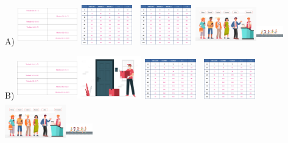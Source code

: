 \begin{escolha}
\begin{escolha}
{{{{A)
\includegraphics[width=1.02736in,height=0.68704in]{media/image110.png}\includegraphics[width=1.01042in,height=0.67572in]{media/image111.png}\includegraphics[width=1.01042in,height=0.67572in]{media/image111.png}\includegraphics[width=1.04264in,height=0.69727in]{media/image113.png}\includegraphics[width=0.45621in,height=0.44100in]{media/image138.png}

B)
\includegraphics[width=1.02736in,height=0.68704in]{media/image110.png}\includegraphics[width=1.09268in,height=0.73073in]{media/image112.png}\includegraphics[width=1.01042in,height=0.67572in]{media/image111.png}\includegraphics[width=1.01042in,height=0.67572in]{media/image111.png}\includegraphics[width=1.04264in,height=0.69727in]{media/image113.png}\includegraphics[width=0.45621in,height=0.44100in]{media/image138.png}

}}}}
\end{escolha}
\end{escolha}
